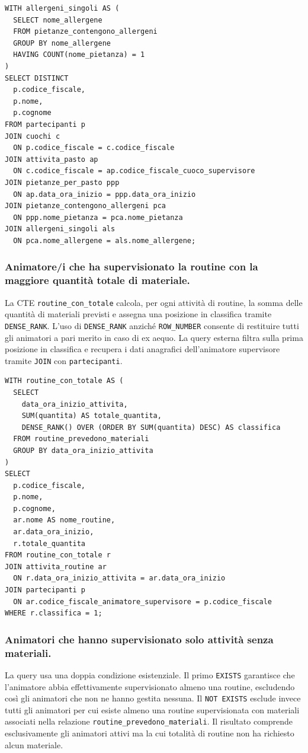 \documentclass[11pt,a4paper]{article}
\begin{document}
\begin{verbatim}
WITH allergeni_singoli AS (
  SELECT nome_allergene
  FROM pietanze_contengono_allergeni
  GROUP BY nome_allergene
  HAVING COUNT(nome_pietanza) = 1
)
SELECT DISTINCT
  p.codice_fiscale,
  p.nome,
  p.cognome
FROM partecipanti p
JOIN cuochi c
  ON p.codice_fiscale = c.codice_fiscale
JOIN attivita_pasto ap
  ON c.codice_fiscale = ap.codice_fiscale_cuoco_supervisore
JOIN pietanze_per_pasto ppp
  ON ap.data_ora_inizio = ppp.data_ora_inizio
JOIN pietanze_contengono_allergeni pca
  ON ppp.nome_pietanza = pca.nome_pietanza
JOIN allergeni_singoli als
  ON pca.nome_allergene = als.nome_allergene;
\end{verbatim}

\subsubsection{Animatore/i che ha supervisionato la routine con la maggiore quantità totale di materiale.}
La CTE \texttt{routine\_con\_totale} calcola, per ogni attività di routine, la somma delle
quantità di materiali previsti e assegna una posizione in classifica tramite
\texttt{DENSE\_RANK}. L'uso di \texttt{DENSE\_RANK} anziché \texttt{ROW\_NUMBER} consente di
restituire tutti gli animatori a pari merito in caso di ex aequo. La query esterna filtra sulla
prima posizione in classifica e recupera i dati anagrafici dell'animatore supervisore tramite
\texttt{JOIN}  con \texttt{partecipanti}.

\begin{verbatim}
WITH routine_con_totale AS (
  SELECT
    data_ora_inizio_attivita,
    SUM(quantita) AS totale_quantita,
    DENSE_RANK() OVER (ORDER BY SUM(quantita) DESC) AS classifica
  FROM routine_prevedono_materiali
  GROUP BY data_ora_inizio_attivita
)
SELECT
  p.codice_fiscale,
  p.nome,
  p.cognome,
  ar.nome AS nome_routine,
  ar.data_ora_inizio,
  r.totale_quantita
FROM routine_con_totale r
JOIN attivita_routine ar
  ON r.data_ora_inizio_attivita = ar.data_ora_inizio
JOIN partecipanti p
  ON ar.codice_fiscale_animatore_supervisore = p.codice_fiscale
WHERE r.classifica = 1;
\end{verbatim}

\subsubsection{Animatori che hanno supervisionato solo attività senza materiali.}
La query usa una doppia condizione esistenziale. Il primo \texttt{EXISTS} garantisce che
l'animatore abbia effettivamente supervisionato almeno una routine, escludendo così gli
animatori che non ne hanno gestita nessuna. Il \texttt{NOT EXISTS} esclude invece tutti gli
animatori per cui esiste almeno una routine supervisionata con materiali associati nella
relazione \texttt{routine\_prevedono\_materiali}. Il risultato comprende esclusivamente gli
animatori attivi ma la cui totalità di routine non ha richiesto alcun materiale.
\end{document}

